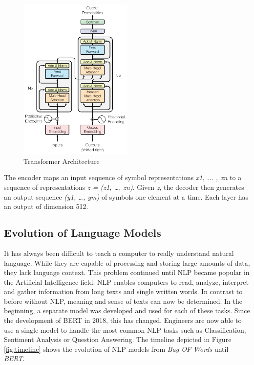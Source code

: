 \begin{figure}[H]
	\centering
	\includegraphics[width=0.5\textwidth]{figures/transformer_architecture.png}
	\caption{Transformer Architecture}
	\label{fig:transformer}
\end{figure}

The encoder maps an input sequence of symbol representations \textit{x1, ... , xn} to a sequence of representations \textit{z = (z1, …, zn)}. Given \textit{z}, the decoder then generates an output sequence \textit{(y1, …, ym)} of symbols one element at a time. Each layer has an output of dimension 512.

\subsection{Evolution of Language Models}
It has always been difficult to teach a computer to really understand natural language. While they are capable of processing and storing large amounts of data, they lack language context. This problem continued until NLP became popular in the Artificial Intelligence field. NLP enables computers to read, analyze, interpret and gather information from long texts and single written words. In contrast to before without NLP, meaning and sense of texts can now be determined. In the beginning, a separate model was developed and used for each of these tasks. Since the development of BERT in 2018, this has changed. Engineers are now able to use a single model to handle the most common NLP tasks such as Classification, Sentiment Analysis or Question Answering. The timeline depicted in Figure \ref{fig:timeline} shows the evolution of NLP models from \textit{Bag OF Words} until \textit{BERT}.

